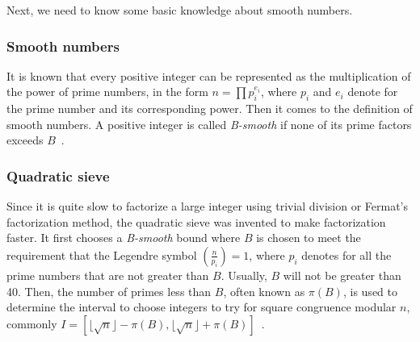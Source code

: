\documentclass[catalog.tex]{subfiles}
\begin{document}
\begin{Algorithm}[Fermat's method\label{alg:\currfilebase_a}]
	\BlankLine
	

\end{Algorithm}

Next, we need to know some basic knowledge about smooth numbers.

\subsubsection{Smooth numbers}
It is known that every positive integer can be represented as the multiplication of the power of prime numbers, in the form $n = \prod p_i^{e_i}$, where $p_i$ and $e_i$ denote for the prime number and its corresponding power. Then it comes to the definition of smooth numbers. A positive integer is called \textit{B-smooth} if none of its prime factors exceeds $B$~\cite{Smooth}.

\subsubsection{Quadratic sieve}
Since it is quite slow to factorize a large integer using trivial division or Fermat's factorization method, the quadratic sieve was invented to make factorization faster. It first chooses a \textit{B-smooth} bound where $B$ is chosen to meet the requirement that the Legendre symbol $(\frac{n}{p_i}) = 1$, where $p_i$ denotes for all the prime numbers that are not greater than $B$. Usually, $B$ will not be greater than 40. Then, the number of primes less than $B$, often known as $\pi(B)$, is used to determine the interval to choose integers to try for square congruence modular $n$, commonly $I = [\lfloor \sqrt{n} \rfloor - \pi(B), \lfloor \sqrt{n} \rfloor + \pi(B)]$~\cite{QS}.
\end{document}
